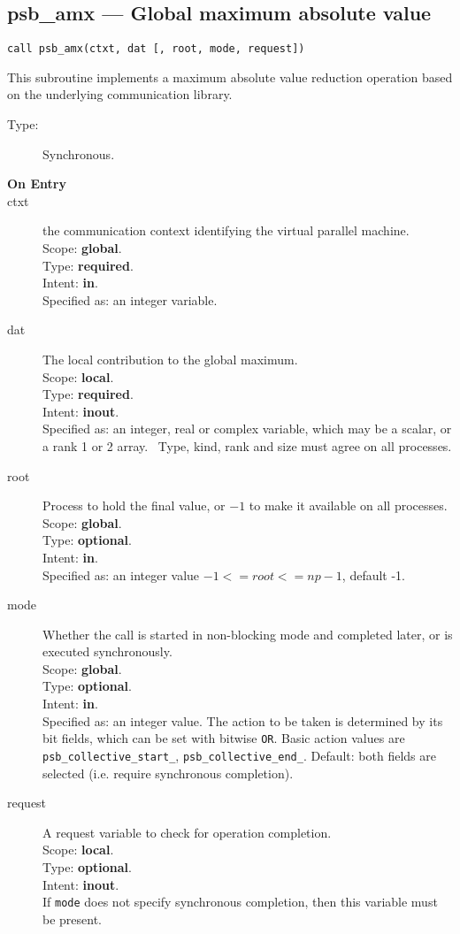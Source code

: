 \clearpage\subsection{psb\_amx --- Global maximum absolute value}

\begin{verbatim}
call psb_amx(ctxt, dat [, root, mode, request])
\end{verbatim}

This subroutine implements a maximum absolute value reduction
operation based on the underlying communication library. 
\begin{description}
\item[Type:] Synchronous.
\item[\bf  On Entry ]
\item[ctxt] the communication context identifying the virtual
  parallel machine.\\
Scope: {\bf global}.\\
Type: {\bf required}.\\
Intent: {\bf in}.\\
Specified as: an integer variable.
\item[dat] The local contribution to the global maximum.\\
Scope: {\bf local}.\\
Type: {\bf required}.\\
Intent: {\bf inout}.\\
Specified as: an integer, real or complex variable, which may be a
scalar, or a rank 1 or 2 array. \
Type, kind, rank and size must agree on all processes.
\item[root] Process to hold the final value, or $-1$ to make it available
  on all processes.\\
Scope: {\bf global}.\\
Type: {\bf optional}.\\
Intent: {\bf in}.\\
Specified as: an integer value $-1<= root <= np-1$, default -1. \\
\item[mode] Whether the call is started in non-blocking mode and completed
  later, or is executed synchronously.\\
Scope: {\bf global}.\\
Type: {\bf optional}.\\
Intent: {\bf in}.\\
Specified as: an integer value. The action to be taken is determined
by its bit fields, which can be set with bitwise \verb|OR|. Basic
action values are \verb|psb_collective_start_|, \verb|psb_collective_end_|.
Default:  both fields are selected (i.e. require synchronous completion).\\
\item[request] A request variable to check for operation completion.\\
Scope: {\bf local}.\\
Type: {\bf optional}.\\
Intent: {\bf inout}.\\
If \verb|mode| does not specify synchronous completion, then this
variable must be present.
\end{description}


